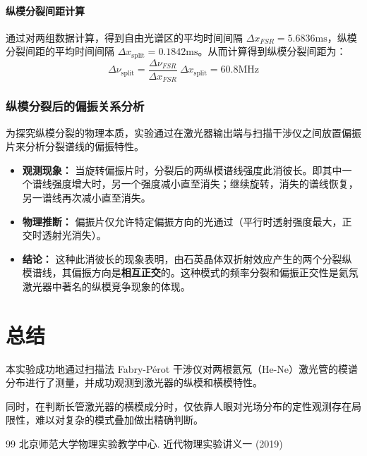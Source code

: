 \documentclass[a4paper, 1.5lines]{ctexart}
\begin{document}
\paragraph{纵模分裂间距计算}

通过对两组数据计算，得到自由光谱区的平均时间间隔 $\Delta x_{FSR} = 5.6836 \mathrm{ms}$，纵模分裂间距的平均时间间隔 $\Delta x_{\text{split}} = 0.1842 \mathrm{ms}$。从而计算得到纵模分裂间距为：
$$
\Delta \nu_{\text{split}} = \dfrac{\Delta \nu_{FSR}}{\Delta x_{FSR}}\ \Delta x_{\text{split}} = 60.8 \mathrm{MHz}
$$

\subsubsection{纵模分裂后的偏振关系分析}

为探究纵模分裂的物理本质，实验通过在激光器输出端与扫描干涉仪之间放置偏振片来分析分裂谱线的偏振特性。

\begin{itemize}
    \item \textbf{观测现象：} 当旋转偏振片时，分裂后的两纵模谱线强度此消彼长。即其中一个谱线强度增大时，另一个强度减小直至消失；继续旋转，消失的谱线恢复，另一谱线再次减小直至消失。
    \item \textbf{物理推断：} 偏振片仅允许特定偏振方向的光通过（平行时透射强度最大，正交时透射光消失）。
    \item \textbf{结论：} 这种此消彼长的现象表明，由石英晶体双折射效应产生的两个分裂纵模谱线，其偏振方向是\textbf{相互正交}的。这种模式的频率分裂和偏振正交性是氦氖激光器中著名的纵模竞争现象的体现。
\end{itemize}
    \section{总结}
        本实验成功地通过扫描法 Fabry-Pérot 干涉仪对两根氦氖（He-Ne）激光管的模谱分布进行了测量，并成功观测到激光器的纵模和横模特性。

        同时，在判断长管激光器的横模成分时，仅依靠人眼对光场分布的定性观测存在局限性，难以对复杂的模式叠加做出精确判断。
        
    \begin{thebibliography}{99}
        北京师范大学物理实验教学中心. 近代物理实验讲义一 (2019)
    \end{thebibliography}

    
\end{document}
